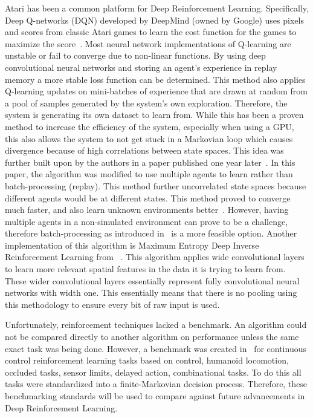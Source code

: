 \documentclass[12pt,american]{report}
\begin{document}
	Atari has been a common platform for Deep Reinforcement Learning. Specifically, Deep Q-networks (DQN) developed by DeepMind (owned by Google) uses pixels and scores from classic Atari games to learn the cost function for the games to maximize the score~\cite{mnih2015human}. Most neural network implementations of Q-learning are unstable or fail to converge due to non-linear functions. By using deep convolutional neural networks and storing an agent's experience in replay memory a more stable loss function can be determined.   This method also applies Q-learning updates on mini-batches of experience that are drawn at random from a pool of samples generated by the system's own exploration. Therefore, the system is generating its own dataset to learn from. While this has been a proven method to increase the efficiency of the system, especially when using a GPU, this also allows the system to not get stuck in a Markovian loop which causes divergence because of high correlations between state spaces.  This idea was further built upon by the authors in a paper published one year later~\cite{mnih2016asynchronous}. In this paper, the algorithm was modified to use multiple agents to learn rather than batch-processing (replay). This method further uncorrelated state spaces because different agents would be at different states. This method proved to converge much faster, and also learn unknown environments better~\cite{mnih2016asynchronous}. However, having multiple agents in a non-simulated environment can prove to be a challenge, therefore batch-processing as introduced in~\cite{mnih2015human} is a more feasible option. Another implementation of this algorithm is Maximum Entropy Deep Inverse Reinforcement Learning from ~\cite{wulfmeier2015maximum}. This algorithm applies wide convolutional layers to learn more relevant spatial features in the data it is trying to learn from. These wider convolutional layers essentially represent fully convolutional neural networks with width one. This essentially means that there is no pooling using this methodology to ensure every bit of raw input is used. 
	
	Unfortunately, reinforcement techniques lacked a benchmark.  An algorithm could not be compared directly to another algorithm on performance unless the same exact task was being done.  However, a benchmark was created in~\cite{duan2016benchmarking} for continuous control reinforcement learning tasks based on control, humanoid locomotion, occluded tasks, sensor limits, delayed action, combinational tasks. To do this all tasks were standardized into a finite-Markovian decision process. Therefore, these benchmarking standards will be used to compare against future advancements in Deep Reinforcement Learning. 
\end{document}
